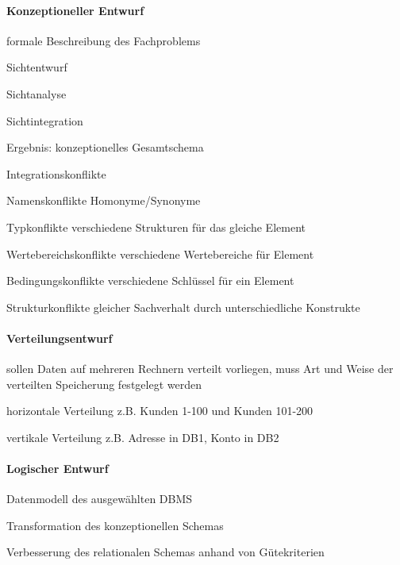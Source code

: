 \documentclass[a4paper]{article}
\begin{document}
\begin{multicols}{3}
    \paragraph{Konzeptioneller Entwurf}
    \begin{itemize*}
        \item formale Beschreibung des Fachproblems
        \begin{itemize*}
            \item Sichtentwurf
            \item Sichtanalyse
            \item Sichtintegration
        \end{itemize*}
        \item Ergebnis: konzeptionelles Gesamtschema
        \item Integrationskonflikte
        \begin{description*}
            \item[Namenskonflikte] Homonyme/Synonyme
            \item[Typkonflikte] verschiedene Strukturen für das gleiche Element
            \item[Wertebereichskonflikte] verschiedene Wertebereiche für Element
            \item[Bedingungskonflikte] verschiedene Schlüssel für ein Element
            \item[Strukturkonflikte] gleicher Sachverhalt durch unterschiedliche Konstrukte
        \end{description*}
    \end{itemize*}

    \paragraph{Verteilungsentwurf}
    \begin{itemize*}
        \item sollen Daten auf mehreren Rechnern verteilt vorliegen, muss Art und Weise der verteilten Speicherung festgelegt werden
        \item horizontale Verteilung z.B. Kunden 1-100 und Kunden 101-200
        \item vertikale Verteilung z.B. Adresse in DB1, Konto in DB2
    \end{itemize*}

    \paragraph{Logischer Entwurf}
    \begin{itemize*}
        \item Datenmodell des ausgewählten DBMS
        \item Transformation des konzeptionellen Schemas
        \item Verbesserung des relationalen Schemas anhand von Gütekriterien
    \end{itemize*}


\end{multicols}
\end{document}
